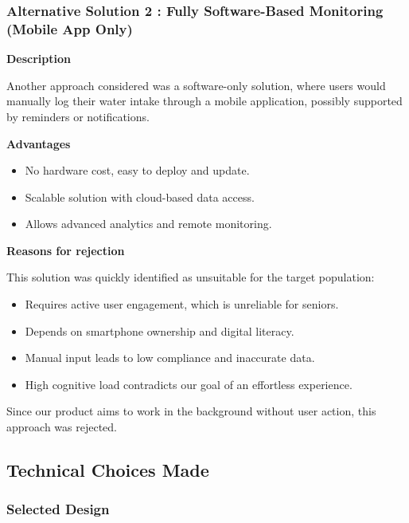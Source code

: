 \documentclass{article}
\begin{document}
\subsubsection*{Alternative Solution 2 : Fully Software-Based Monitoring (Mobile App Only)}

\textbf{Description}\vspace{0.2cm}

Another approach considered was a software-only solution, where users would manually log their water intake through a mobile application, possibly supported by reminders or notifications.\vspace{0.2cm}

\textbf{Advantages}
\begin{itemize}
    \item No hardware cost, easy to deploy and update.
    \item Scalable solution with cloud-based data access.
    \item Allows advanced analytics and remote monitoring.
\end{itemize}

\textbf{Reasons for rejection}\vspace{0.2cm}

This solution was quickly identified as unsuitable for the target population:
\begin{itemize}
    \item Requires active user engagement, which is unreliable for seniors.
    \item Depends on smartphone ownership and digital literacy.
    \item Manual input leads to low compliance and inaccurate data.
    \item High cognitive load contradicts our goal of an effortless experience.
\end{itemize}

Since our product aims to work in the background without user action, this approach was rejected.



\subsection{Technical Choices Made}

\subsubsection{Selected Design}
\label{subsec:design}
\end{document}
